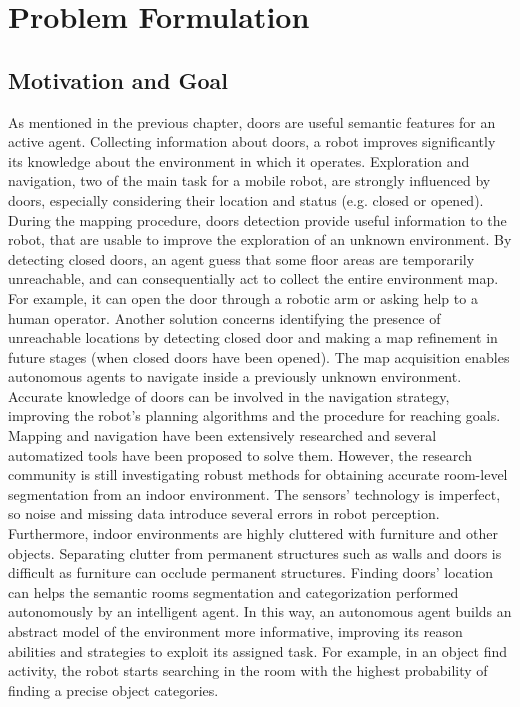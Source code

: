 \chapter{Problem Formulation}
\label{capitolo3}
\thispagestyle{empty}

\section{Motivation and Goal}

As mentioned in the previous chapter, doors are useful semantic features for an active agent. Collecting information about doors, a robot improves significantly its knowledge about the environment in which it operates. Exploration and navigation, two of the main task for a mobile robot, are strongly influenced by doors, especially considering their location and status (e.g. closed or opened). During the mapping procedure, doors detection provide useful information to the robot, that are usable to improve the exploration of an unknown environment. By detecting closed doors, an agent guess that some floor areas are temporarily unreachable, and can consequentially act to collect the entire environment map. For example, it can open the door through a robotic arm or asking help to a human operator. Another solution concerns identifying the presence of unreachable locations by detecting closed door and making a map refinement in future stages (when closed doors have been opened). The map acquisition enables autonomous agents to navigate inside a previously unknown environment. Accurate knowledge of doors can be involved in the navigation strategy, improving the robot's planning algorithms and the procedure for reaching goals. Mapping and navigation have been extensively researched and several automatized tools have been proposed to solve them. However, the research community is still investigating robust methods for obtaining accurate room-level segmentation from an indoor environment. The sensors' technology is imperfect, so noise and missing data introduce several errors in robot perception. Furthermore, indoor environments are highly cluttered with furniture and other objects. Separating clutter from permanent structures such as walls and doors is difficult as furniture can occlude permanent structures. Finding doors' location can helps the semantic rooms segmentation and categorization performed autonomously by an intelligent agent. In this way, an autonomous agent builds an abstract model of the environment more informative, improving its reason abilities and strategies to exploit its assigned task. For example, in an object find activity, the robot starts searching in the room with the highest probability of finding a precise object categories.

